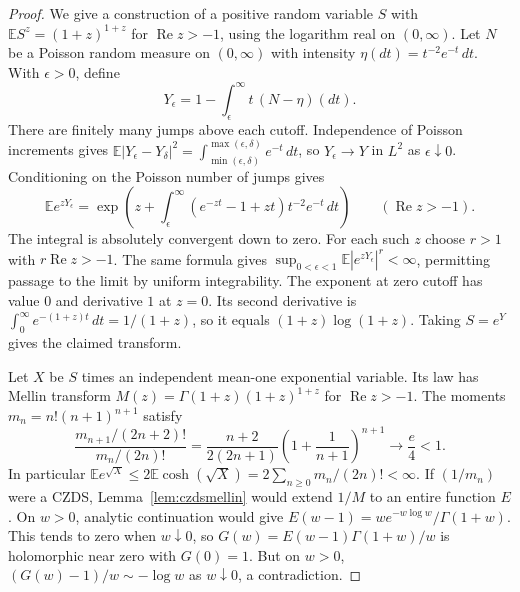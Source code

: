 \documentclass[11pt,a4paper]{article}
\begin{document}
\begin{proof}
We give a construction of a positive random variable $S$ with
$\mathbb E S^z=(1+z)^{1+z}$ for $\operatorname{Re}z>-1$,
using the logarithm real on $(0,\infty)$. Let $N$ be a Poisson random
measure on $(0,\infty)$ with intensity
$\eta(dt)=t^{-2}e^{-t}\,dt$. With $\epsilon>0$, define
\[
       Y_\epsilon=1-\int_\epsilon^\infty t\,(N-\eta)(dt).
\]
There are finitely many jumps above each cutoff. Independence of Poisson
increments gives
$\mathbb E|Y_\epsilon-Y_\delta|^2
=\int_{\min(\epsilon,\delta)}^{\max(\epsilon,\delta)}e^{-t}\,dt$,
so $Y_\epsilon\to Y$ in $L^2$ as $\epsilon\downarrow0$. Conditioning
on the Poisson number of jumps gives
\[
   \mathbb E e^{zY_\epsilon}=
   \exp\!\left(z+\int_\epsilon^\infty
     (e^{-zt}-1+zt)t^{-2}e^{-t}\,dt\right)
       \qquad(\operatorname{Re}z>-1).
\]
The integral is absolutely convergent down to zero. For each such $z$
choose $r>1$ with $r\operatorname{Re}z>-1$. The same formula gives
$\sup_{0<\epsilon<1}\mathbb E|e^{zY_\epsilon}|^r<\infty$, permitting
passage to the limit by uniform integrability. The exponent at zero
cutoff has value $0$ and derivative $1$ at $z=0$. Its second
derivative is $\int_0^\infty e^{-(1+z)t}\,dt=1/(1+z)$, so it equals
$(1+z)\log(1+z)$. Taking $S=e^Y$ gives the claimed transform.

Let $X$ be $S$ times an independent mean-one exponential variable.
Its law has Mellin transform
$M(z)=\Gamma(1+z)(1+z)^{1+z}$ for $\operatorname{Re}z>-1$.
The moments $m_n=n!(n+1)^{n+1}$ satisfy
\[
  \frac{m_{n+1}/(2n+2)!}{m_n/(2n)!}
  =\frac{n+2}{2(2n+1)}\left(1+\frac1{n+1}\right)^{n+1}
  \longrightarrow \frac{e}{4}<1 .
\]
In particular $\mathbb E e^{\sqrt X}\le 2\mathbb E\cosh(\sqrt X)
=2\sum_{n\ge0}m_n/(2n)!<\infty$. If $(1/m_n)$ were a CZDS,
Lemma~\ref{lem:czdsmellin} would extend $1/M$ to an entire function
$E$. On $w>0$, analytic continuation would give
$E(w-1)=w e^{-w\log w}/\Gamma(1+w)$. This tends to zero when
$w\downarrow0$, so $G(w)=E(w-1)\Gamma(1+w)/w$ is holomorphic near
zero with $G(0)=1$. But on $w>0$,
$(G(w)-1)/w\sim-\log w$ as $w\downarrow0$, a contradiction.
\end{proof}
\end{document}
